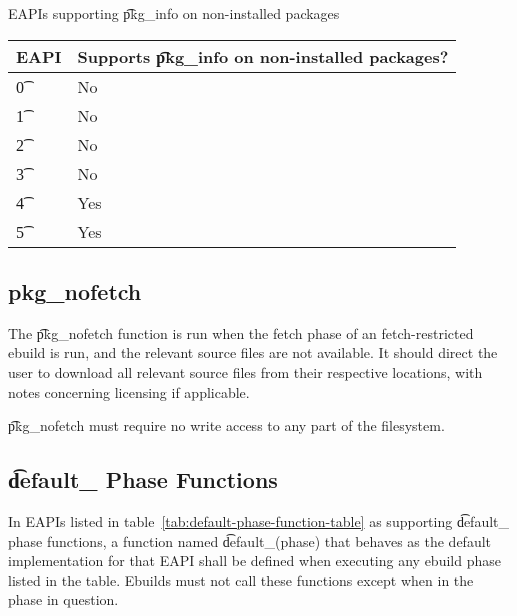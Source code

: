 \begin{centertable}{EAPIs supporting \t{pkg\_info} on non-installed packages} \label{tab:pkg-info-table}
    \begin{tabular}{ l l }
        \toprule
        \multicolumn{1}{c}{\textbf{EAPI}} &
        \multicolumn{1}{c}{\textbf{Supports \t{pkg\_info} on non-installed packages?}} \\
        \midrule
    \t{0} & No \\
    \t{1} & No \\
    \t{2} & No \\
    \t{3} & No \\
    \t{4} & Yes \\
    \t{5} & Yes \\
    \bottomrule
    \end{tabular}
\end{centertable}

\subsection{pkg\_nofetch}
\label{sec:pkg-nofetch-function}

The \t{pkg\_nofetch} function is run when the fetch phase of an fetch-restricted ebuild is run, and
the relevant source files are not available. It should direct the user to download all relevant
source files from their respective locations, with notes concerning licensing if applicable.

\t{pkg\_nofetch} must require no write access to any part of the filesystem.

\subsection{\t{default\_} Phase Functions}
\label{sec:default-phase-funcs}

 In EAPIs listed in
table~\ref{tab:default-phase-function-table} as supporting \t{default\_} phase functions, a function
named \t{default\_}(phase) that behaves as the default implementation for that EAPI shall be defined
when executing any ebuild phase listed in the table. Ebuilds must not call these functions except
when in the phase in question.

